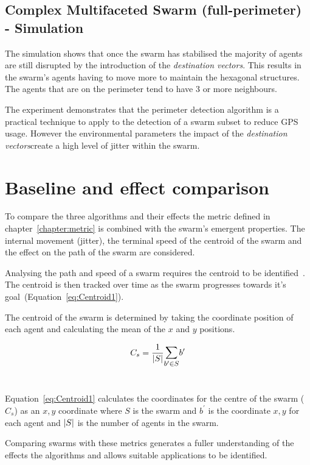 \subsection{Complex Multifaceted Swarm (full-perimeter) - Simulation}
The simulation shows that once the swarm has stabilised the majority of agents are still disrupted by the introduction of the \textit{destination vectors}. This results in the swarm's agents having to move more to maintain the hexagonal structures. The agents that are on the perimeter tend to have 3 or more neighbours. 

The experiment demonstrates that the perimeter detection algorithm is a practical technique to apply to the detection of a swarm subset to reduce GPS usage. However the environmental parameters the impact of the \textit{destination vectors}create a high level of jitter within the swarm.

\section{Baseline and effect comparison\label{section:compareBaselineAll1}}
To compare the three algorithms and their effects the metric defined in chapter~\ref{chapter:metric} is combined with the swarm's emergent properties. The internal movement (jitter), the terminal speed of the centroid of the swarm and the effect on the path of the swarm are considered. 

Analysing the path and speed of a swarm requires the centroid to be identified~\cite{HAY:08,VG:05,GP:02,GP:04,GP:04a,GP:05,GP:11}. The centroid is then tracked over time as the swarm progresses towards it's goal~(Equation~\ref{eq:Centroid1}).

The centroid of the swarm is determined by taking the coordinate position of each agent and calculating the mean of the $x$ and $y$ positions.

\begin{equation}\label{eq:Centroid1}
C_s = \frac{1}{\card{S}}\mathlarger{\sum_{b' \in S}} b'
\end{equation}‎

Equation~\ref{eq:Centroid1} calculates the coordinates for the centre of the swarm ($C_s$) as an $x,y$ coordinate where $S$ is the swarm and $b^{'}$ is the coordinate $x,y$ for each agent and $\vert{S}\vert$ is the number of agents in the swarm.

Comparing swarms with these metrics generates a fuller understanding of the effects the algorithms and allows suitable applications to be identified.

